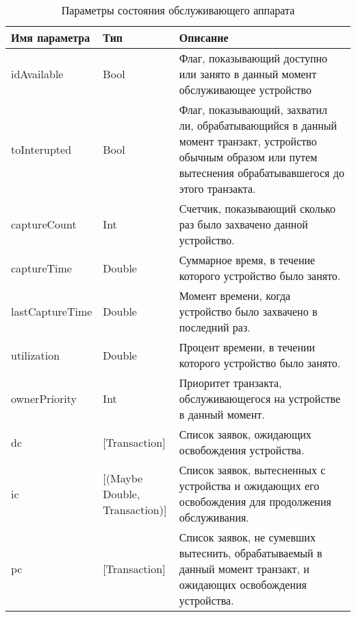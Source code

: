 \begin{table}
\caption{Параметры состояния обслуживающего аппарата}
\label{tab:facState}
\begin{tabular}{|l|l|p{}|}
\hline
Имя параметра & Тип & Описание \\
\hline
idAvailable & Bool & Флаг, показывающий доступно или занято в данный момент обслуживающее устройство\\
\hline
toInterupted & Bool & Флаг, показывающий, захватил ли, обрабатывающийся в данный момент транзакт, устройство обычным образом или путем вытеснения обрабатывавшегося до этого транзакта.\\
\hline
captureCount & Int & Счетчик, показывающий сколько раз было захвачено данной устройство.\\
\hline
captureTime & Double & Суммарное время, в течение которого устройство было занято.\\
\hline
lastCaptureTime & Double & Момент времени, когда устройство было захвачено в последний раз.\\
\hline
utilization & Double & Процент времени, в течении которого устройство было занято.\\
\hline
ownerPriority & Int & Приоритет транзакта, обслуживающегося на устройстве в данный момент. \\
\hline
dc & [Transaction] & Список заявок, ожидающих освобождения устройства. \\
\hline
ic & \parbox{25mm}{[(Maybe Double,\\Transaction)] }  & Список заявок, вытесненных с устройства и ожидающих его освобождения для продолжения обслуживания.\\
\hline
pc & [Transaction] & Список заявок, не сумевших вытеснить, обрабатываемый в данный момент транзакт, и ожидающих освобождения устройства.\\
\hline
\end{tabular}
\end{table}


